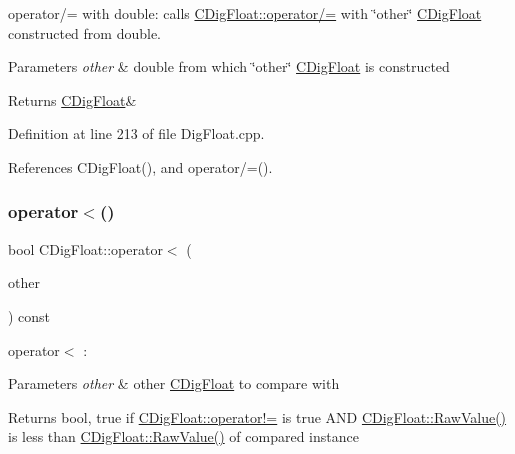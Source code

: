 operator/= with double\+: calls \hyperlink{classCDigFloat_a53d3939dfc89d172f1bf803a46bc3369}{C\+Dig\+Float\+::operator/=} with \char`\"{}other\char`\"{} \hyperlink{classCDigFloat}{C\+Dig\+Float} constructed from double. 


\begin{DoxyParams}{Parameters}
{\em other} & double from which \char`\"{}other\char`\"{} \hyperlink{classCDigFloat}{C\+Dig\+Float} is constructed \\
\hline
\end{DoxyParams}
\begin{DoxyReturn}{Returns}
\hyperlink{classCDigFloat}{C\+Dig\+Float}\& 
\end{DoxyReturn}


Definition at line 213 of file Dig\+Float.\+cpp.



References C\+Dig\+Float(), and operator/=().

\mbox{\label{classCDigFloat_a159ef0b911dfba94ea468c36167c3a42}} 
\subsubsection{\texorpdfstring{operator$<$()}{operator<()}}
{\footnotesize\ttfamily bool C\+Dig\+Float\+::operator$<$ (\begin{DoxyParamCaption}\item[{const \hyperlink{classCDigFloat}{C\+Dig\+Float} \&}]{other }\end{DoxyParamCaption}) const}



operator$<$ \+: 


\begin{DoxyParams}{Parameters}
{\em other} & other \hyperlink{classCDigFloat}{C\+Dig\+Float} to compare with \\
\hline
\end{DoxyParams}
\begin{DoxyReturn}{Returns}
bool, true if \hyperlink{classCDigFloat_a15c13c035aff8184491bd9629403a33a}{C\+Dig\+Float\+::operator!=} is true A\+ND \hyperlink{classCDigFloat_ab6d3001a549d7496156321cbb26dde51}{C\+Dig\+Float\+::\+Raw\+Value()} is less than \hyperlink{classCDigFloat_ab6d3001a549d7496156321cbb26dde51}{C\+Dig\+Float\+::\+Raw\+Value()} of compared instance 
\end{DoxyReturn}


